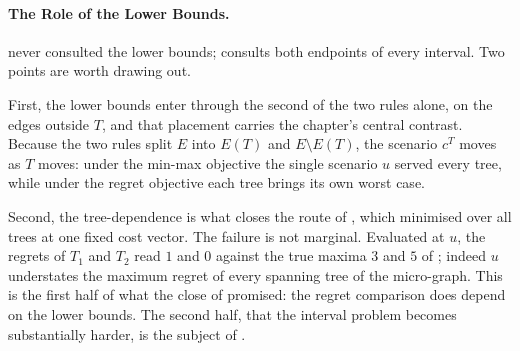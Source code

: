 \paragraph{The Role of the Lower Bounds.}

 never consulted the lower bounds;  consults both endpoints of every interval.
Two points are worth drawing out.

First, the lower bounds enter through the second of the two rules alone, on the edges outside $T$, and that placement carries the chapter's central contrast.
Because the two rules split $E$ into $E(T)$ and $E \setminus E(T)$, the scenario $c^{T}$ moves as $T$ moves: under the min-max objective the single scenario $u$ served every tree, while under the regret objective each tree brings its own worst case.

Second, the tree-dependence is what closes the route of , which minimised over all trees at one fixed cost vector.
The failure is not marginal.
Evaluated at $u$, the regrets of $T_1$ and $T_2$ read $1$ and $0$ against the true maxima $3$ and $5$ of ; indeed $u$ understates the maximum regret of every spanning tree of the micro-graph.
This is the first half of what the close of  promised: the regret comparison does depend on the lower bounds.
The second half, that the interval problem becomes substantially harder, is the subject of .

